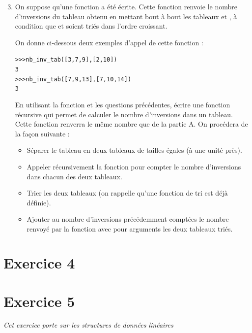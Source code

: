 \documentclass[11pt,a4paper,french,twoside]{PMCours}
\begin{document}
\begin{enumerate}\setcounter{enumi}{2}
\item On suppose qu'une fonction  a été écrite. Cette fonction
renvoie le nombre d'inversions du tableau obtenu en mettant bout à bout les tableaux
 et , à condition que  et  soient triés dans l'ordre croissant.

On donne ci-dessous deux exemples d'appel de cette fonction :
\begin{alltt}
>>> nb\_inv\_tab([3, 7, 9], [2, 10])
3
>>> nb\_inv\_tab([7, 9, 13], [7, 10, 14])
3
\end{alltt}
En utilisant la fonction  et les questions précédentes, écrire une fonction
récursive  qui permet de calculer le nombre d'inversions
dans un tableau. Cette fonction renverra le même nombre que
 de la partie A. On procédera de la façon suivante :
\begin{itemize}
\item Séparer le tableau en deux tableaux de tailles égales (à une unité près).
\item Appeler récursivement la fonction  pour compter le nombre
d'inversions dans chacun des deux tableaux.
\item Trier les deux tableaux (on rappelle qu'une fonction de tri est déjà définie).
\item Ajouter au nombre d'inversions précédemment comptées le nombre renvoyé par la
fonction  avec pour arguments les deux tableaux triés.
\end{itemize}
\end{enumerate}

\newpage
\section*{Exercice 4}



\newpage
\section*{Exercice 5}
\emph{Cet exercice porte sur les structures de données linéaires}
\end{document}
